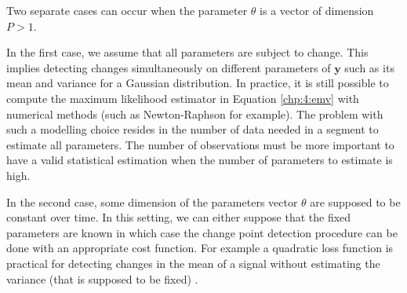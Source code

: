 Two separate cases can occur when the parameter $\theta$ is a vector of dimension $P > 1$.  

In the first case, we assume that all parameters are subject to change. This implies detecting changes simultaneously on different parameters of $\bm y$ such as its mean and variance for a Gaussian distribution. In practice, it is still possible to compute the maximum likelihood estimator in Equation \eqref{chp:4:emv} with numerical methods (such as Newton-Raphson for example). The problem with such a modelling choice resides in the number of data needed in a segment to estimate all parameters. The number of observations must be more important to have a valid statistical estimation when the number of parameters to estimate is high.  

In the second case, some dimension of the parameters vector $\theta$ are supposed to be constant over time. In this setting, we can either suppose that the fixed parameters are known in which case the change point detection procedure can be done with an appropriate cost function. For example a quadratic loss function is practical for detecting changes in the mean of a signal without estimating the variance (that is supposed to be fixed) \citep{Fearnhead2018a}. 


